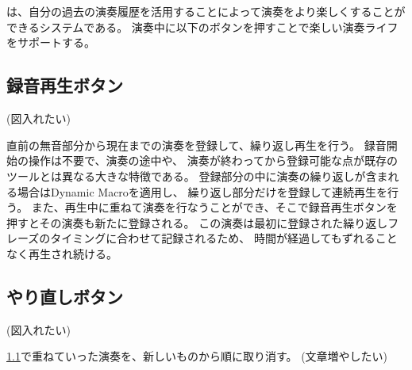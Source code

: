 \section{\system}
\label{repiano}

%

{\system}は、自分の過去の演奏履歴を活用することによって演奏をより楽しくすることができるシステムである。
演奏中に以下のボタンを押すことで楽しい演奏ライフをサポートする。

\subsection{録音再生ボタン}
\label{recplaybutton}
(図入れたい)

直前の無音部分から現在までの演奏を登録して、繰り返し再生を行う。
録音開始の操作は不要で、演奏の途中や、
演奏が終わってから登録可能な点が既存のツールとは異なる大きな特徴である。
登録部分の中に演奏の繰り返しが含まれる場合はDynamic Macro\cite{masui}を適用し、
繰り返し部分だけを登録して連続再生を行う。
また、再生中に重ねて演奏を行なうことができ、そこで録音再生ボタンを押すとその演奏も新たに登録される。
この演奏は最初に登録された繰り返しフレーズのタイミングに合わせて記録されるため、
時間が経過してもずれることなく再生され続ける。

\subsection{やり直しボタン}
(図入れたい)

\ref{recplaybutton}で重ねていった演奏を、新しいものから順に取り消す。
(文章増やしたい)
